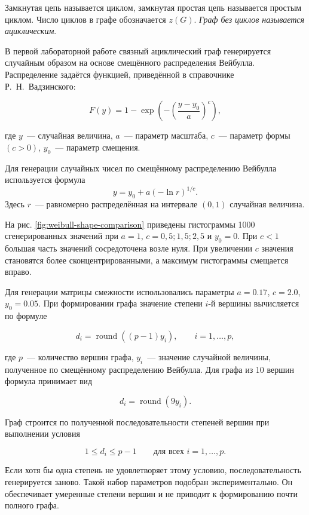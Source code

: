 Замкнутая цепь называется циклом, замкнутая простая цепь называется простым циклом. Число циклов в графе обозначается $z(G)$. \textit{Граф без циклов называется ациклическим}.


\vspace{1em}

В первой лабораторной работе связный ациклический граф генерируется случайным образом на основе смещённого распределения Вейбулла. Распределение задаётся функцией, приведённой в справочнике Р.~Н.~Вадзинского:

\[
F(y) = 1 - \exp\left(-\left(\frac{y-y_0}{a}\right)^c\right),
\]

где $y$~--- случайная величина, $a$~--- параметр масштаба, $c$~--- параметр формы $(c > 0)$, $y_0$~--- параметр смещения.

Для генерации случайных чисел по смещённому распределению Вейбулла используется формула
\[
y = y_0 + a(-\ln r)^{1/c}.
\]
Здесь $r$~--- равномерно распределённая на интервале $(0, 1)$ случайная величина.

На рис. \ref{fig:weibull-shape-comparison} приведены гистограммы 1000 сгенерированных значений при $a=1$, $c=0{,}5; 1{,}5; 2{,}5$ и $y_0=0$. При $c<1$ большая часть значений сосредоточена возле нуля. При увеличении $c$ значения становятся более сконцентрированными, а максимум гистограммы смещается вправо.


Для генерации матрицы смежности использовались параметры $a=0.17$, $c=2.0$, $y_0=0.05$. При формировании графа значение степени $i$-й вершины вычисляется по формуле

\[
d_i = \operatorname{round}\left((p-1)y_i\right),
\qquad i=1,\ldots,p,
\]

где $p$~--- количество вершин графа, $y_i$~--- значение случайной величины, полученное по смещённому распределению Вейбулла. Для графа из 10 вершин формула принимает вид

\[
d_i = \operatorname{round}(9y_i).
\]

Граф строится по полученной последовательности степеней вершин при выполнении условия

\[
1 \leq d_i \leq p-1
\qquad \text{для всех } i=1,\ldots,p.
\]

Если хотя бы одна степень не удовлетворяет этому условию, последовательность генерируется заново. Такой набор параметров подобран экспериментально. Он обеспечивает умеренные степени вершин и не приводит к формированию почти полного графа.

